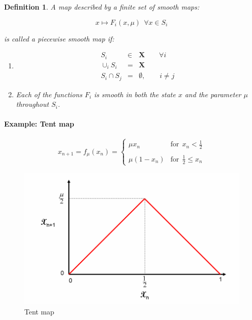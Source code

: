 \documentclass{book}
\renewcommand{\(}{\begin{columns}}
\renewcommand{\)}{\end{columns}}
\newcommand{\<}[1]{\begin{column}{#1}}
\renewcommand{\>}{\end{column}}
\newcommand{\para}{\paragraph}
\newtheorem{definition}{Definition}[section]
\begin{document}
\begin{definition}
A map  described by a \emph{finite} set of \emph{smooth} maps:

\begin{equation}
\label{eq-pwmap}
x\mapsto F_i(x,\mu)~~\forall x\in S_i
\end{equation}

is called a piecewise smooth map if:

\begin{enumerate}
\item 
\begin{eqnarray*}
S_i&\in& \mathbf{X}\hspace{2em} \forall i\\
\cup_i S_i&=&\mathbf{X}\\
S_i\cap S_j&=&\emptyset, \hspace{2em} i\ne j
\end{eqnarray*}

\item Each of the functions $F_i$ is smooth in both the state $x$ and the parameter 
$\mu$ throughout $S_i$.  
\end{enumerate}
\end{definition}
\para{Example: Tent map}
\begin{equation}
\label{eq-tent}
x_{n+1}=f_\mu(x_n)=\begin{cases} \mu x_n & \mathrm{for}~~ x_n < \frac{1}{2} \\ \\ \mu (1-x_n) & \mathrm{for}~~ \frac{1}{2} \le x_n \end{cases}
\end{equation}


\begin{figure}[!htp]
\caption{Tent map}
\begin{center}
\includegraphics[width=0.7\columnwidth]{Tent_map}
\end{center}
\end{figure}
\end{document}
